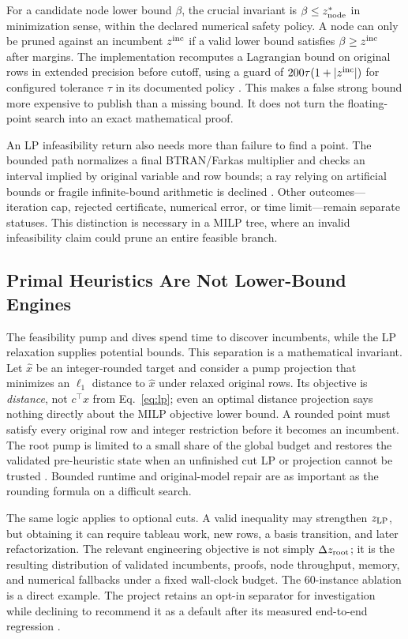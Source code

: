 \documentclass[10pt,a4paper,twocolumn]{article}
\begin{document}
For a candidate node lower bound $\beta$, the crucial invariant is $\beta\leq z^*_{\rm node}$ in minimization sense, within the declared numerical safety policy. A node can only be pruned against an incumbent $z^{\rm inc}$ if a valid lower bound satisfies $\beta\geq z^{\rm inc}$ after margins. The implementation recomputes a Lagrangian bound on original rows in extended precision before cutoff, using a guard of $200\tau(1+|z^{\rm inc}|)$ for configured tolerance $\tau$ in its documented policy \cite{bounded}. This makes a false strong bound more expensive to publish than a missing bound. It does not turn the floating-point search into an exact mathematical proof.

An LP infeasibility return also needs more than failure to find a point. The bounded path normalizes a final BTRAN/Farkas multiplier and checks an interval implied by original variable and row bounds; a ray relying on artificial bounds or fragile infinite-bound arithmetic is declined \cite{bounded}. Other outcomes---iteration cap, rejected certificate, numerical error, or time limit---remain separate statuses. This distinction is necessary in a MILP tree, where an invalid infeasibility claim could prune an entire feasible branch.

\subsection{Primal Heuristics Are Not Lower-Bound Engines}

The feasibility pump and dives spend time to discover incumbents, while the LP relaxation supplies potential bounds. This separation is a mathematical invariant. Let $\hat x$ be an integer-rounded target and consider a pump projection that minimizes an $\ell_1$ distance to $\hat x$ under relaxed original rows. Its objective is \emph{distance}, not $c^\top x$ from Eq.~\eqref{eq:lp}; even an optimal distance projection says nothing directly about the MILP objective lower bound. A rounded point must satisfy every original row and integer restriction before it becomes an incumbent. The root pump is limited to a small share of the global budget and restores the validated pre-heuristic state when an unfinished cut LP or projection cannot be trusted \cite{arch}. Bounded runtime and original-model repair are as important as the rounding formula on a difficult search.

The same logic applies to optional cuts. A valid inequality may strengthen $z_{\rm LP}$, but obtaining it can require tableau work, new rows, a basis transition, and later refactorization. The relevant engineering objective is not simply $\Delta z_{\rm root}$; it is the resulting distribution of validated incumbents, proofs, node throughput, memory, and numerical fallbacks under a fixed wall-clock budget. The 60-instance ablation is a direct example. The project retains an opt-in separator for investigation while declining to recommend it as a default after its measured end-to-end regression \cite{iter37}.
\end{document}
